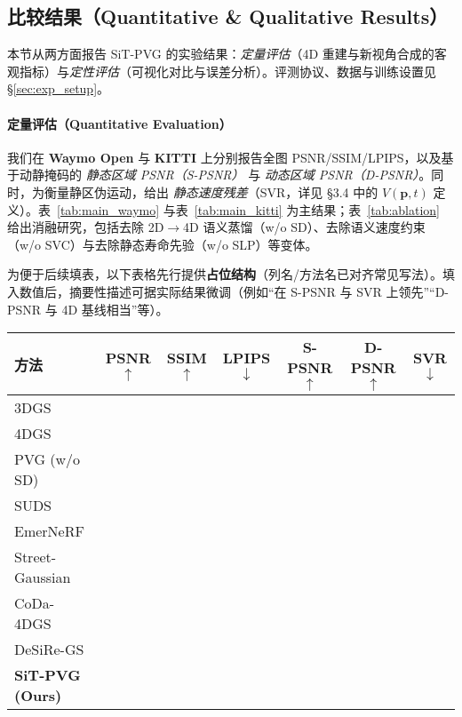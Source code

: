 \documentclass[10pt,conference]{IEEEtran} %
\begin{document}
\subsection{比较结果（Quantitative \& Qualitative Results）}
\label{sec:results}

本节从两方面报告 SiT\mbox{-}PVG 的实验结果：\emph{定量评估}（4D 重建与新视角合成的客观指标）与\emph{定性评估}（可视化对比与误差分析）。评测协议、数据与训练设置见 \S\ref{sec:exp_setup}。

\paragraph{定量评估（Quantitative Evaluation）}
我们在 \textbf{Waymo Open} 与 \textbf{KITTI} 上分别报告全图 PSNR/SSIM/LPIPS，以及基于动静掩码的 \emph{静态区域 PSNR（S-PSNR）} 与 \emph{动态区域 PSNR（D-PSNR）}。同时，为衡量静区伪运动，给出 \emph{静态速度残差}（SVR，详见 \S3.4 中的 $V(\mathbf p,t)$ 定义）。表~\ref{tab:main_waymo} 与表~\ref{tab:main_kitti} 为主结果；表~\ref{tab:ablation} 给出消融研究，包括去除 2D$\to$4D 语义蒸馏（w/o SD）、去除语义速度约束（w/o SVC）与去除静态寿命先验（w/o SLP）等变体。

为便于后续填表，以下表格先行提供\textbf{占位结构}（列名/方法名已对齐常见写法）。填入数值后，摘要性描述可据实际结果微调（例如“在 S-PSNR 与 SVR 上领先”“D-PSNR 与 4D 基线相当”等）。

\begin{table*}[t]
\centering
\caption{Waymo Open 上的主结果（4D 重建与新视角合成）。$\uparrow$ 越大越好，$\downarrow$ 越小越好。PSNR/SSIM/LPIPS 为全图指标；S-PSNR, D-PSNR 分别在静/动态区域统计；SVR 衡量静区伪运动。}
\label{tab:main_waymo}
\renewcommand{\arraystretch}{1.12}
\begin{tabular}{lcccccc}
\toprule
方法 & PSNR$\uparrow$ & SSIM$\uparrow$ & LPIPS$\downarrow$ & S\mbox{-}PSNR$\uparrow$ & D\mbox{-}PSNR$\uparrow$ & SVR$\downarrow$ \\
\midrule
3DGS &  &  &  &  &  &  \\
4DGS &  &  &  &  &  &  \\
PVG (w/o SD) &  &  &  &  &  &  \\
SUDS &  &  &  &  &  &  \\
EmerNeRF &  &  &  &  &  &  \\
Street\mbox{-}Gaussian &  &  &  &  &  &  \\
CoDa\mbox{-}4DGS &  &  &  &  &  &  \\
DeSiRe\mbox{-}GS &  &  &  &  &  &  \\
\textbf{SiT\mbox{-}PVG (Ours)} &  &  &  &  &  &  \\
\bottomrule
\end{tabular}
\end{table*}
\end{document}
